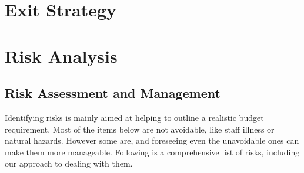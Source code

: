 \documentclass[11pt]{article}
\begin{document}
\section{Exit Strategy}

\newpage
\section{Risk Analysis}

  \subsection{Risk Assessment and Management}
Identifying risks is mainly aimed at helping to outline a realistic budget requirement. Most of the items below are not avoidable, like staff illness or natural hazards. However some are, and foreseeing even the unavoidable ones can make them more manageable. Following is a comprehensive list of risks, including our approach to dealing with them.
\end{document}
